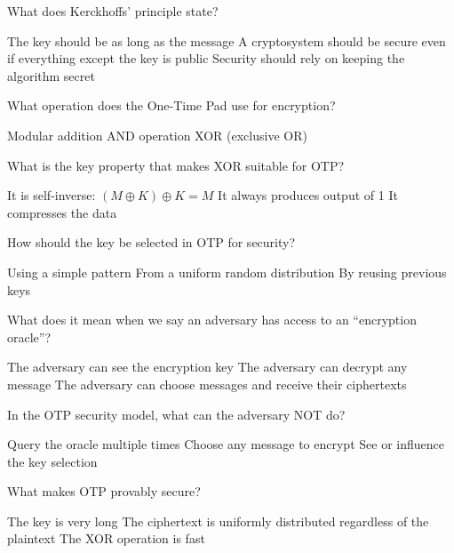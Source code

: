\documentclass[10pt,a4paper,american]{exam}
\begin{document}
\begin{questions}
	\question What does Kerckhoffs' principle state?
	\begin{randomizechoices}
		\choice The key should be as long as the message
		\CorrectChoice A cryptosystem should be secure even if everything except the key is public
		\choice Security should rely on keeping the algorithm secret
	\end{randomizechoices}

	\question What operation does the One-Time Pad use for encryption?
	\begin{randomizechoices}
		\choice Modular addition
		\choice AND operation
		\CorrectChoice XOR (exclusive OR)
	\end{randomizechoices}

	\question What is the key property that makes XOR suitable for OTP?
	\begin{randomizechoices}
		\CorrectChoice It is self-inverse: $(M \oplus K) \oplus K = M$
		\choice It always produces output of 1
		\choice It compresses the data
	\end{randomizechoices}

	\question How should the key be selected in OTP for security?
	\begin{randomizechoices}
		\choice Using a simple pattern
		\CorrectChoice From a uniform random distribution
		\choice By reusing previous keys
	\end{randomizechoices}

	\question What does it mean when we say an adversary has access to an ``encryption oracle''?
	\begin{randomizechoices}
		\choice The adversary can see the encryption key
		\choice The adversary can decrypt any message
		\CorrectChoice The adversary can choose messages and receive their ciphertexts
	\end{randomizechoices}

	\question In the OTP security model, what can the adversary NOT do?
	\begin{randomizechoices}
		\choice Query the oracle multiple times
		\choice Choose any message to encrypt
		\CorrectChoice See or influence the key selection
	\end{randomizechoices}

	\question What makes OTP provably secure?
	\begin{randomizechoices}
		\choice The key is very long
		\CorrectChoice The ciphertext is uniformly distributed regardless of the plaintext
		\choice The XOR operation is fast
	\end{randomizechoices}


\end{questions}
\end{document}
